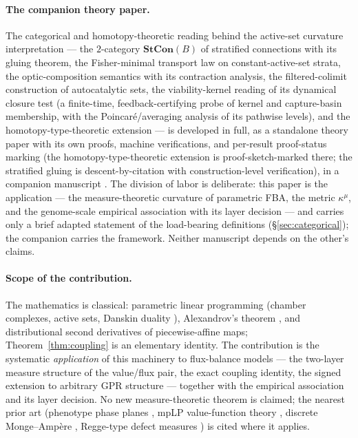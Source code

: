 \documentclass[11pt,a4paper]{article}
\theoremstyle{plain}
\theoremstyle{definition}
\theoremstyle{remark}
\newcommand{\kmu}{\kappa^{\mu}}
\begin{document}
\paragraph{The companion theory paper.}
The categorical and homotopy-theoretic reading behind the
active-set curvature interpretation --- the $2$-category
$\mathbf{StCon}(B)$ of stratified connections with its gluing
theorem, the Fisher-minimal transport law on constant-active-set
strata, the optic-composition semantics with its contraction
analysis, the filtered-colimit construction of autocatalytic sets,
the viability-kernel reading of its dynamical closure test (a
finite-time, feedback-certifying probe of kernel and capture-basin
membership, with the Poincar\'e/averaging analysis of its pathwise
levels), and the homotopy-type-theoretic extension --- is developed
in full,
as a standalone theory paper with its own proofs, machine
verifications, and per-result proof-status marking (the
homotopy-type-theoretic extension is proof-sketch-marked there; the
stratified gluing is descent-by-citation with construction-level
verification), in a companion manuscript \citep{zai2026categorical}.
The division of labor is deliberate: this paper is the application --- the
measure-theoretic curvature of parametric FBA, the metric $\kmu$,
and the genome-scale empirical association with its layer decision
--- and carries only a brief adapted statement of the load-bearing
definitions (\S\ref{sec:categorical}); the companion carries the
framework. Neither manuscript depends on the other's claims.

\paragraph{Scope of the contribution.}
The mathematics is classical: parametric linear programming (chamber
complexes, active sets, Danskin duality \citep{danskin1967}), Alexandrov's theorem \citep{alexandrov1939}, and
distributional second derivatives of piecewise-affine maps;
Theorem~\ref{thm:coupling} is an elementary identity. The contribution
is the systematic \emph{application} of this machinery to flux-balance
models \citep{varma1994, orth2010, lewis2010} --- the two-layer measure structure of the value/flux pair,
the exact coupling identity, the signed extension to arbitrary GPR
structure --- together with the empirical association and its layer
decision. No new measure-theoretic theorem is claimed; the nearest
prior art (phenotype phase planes \citep{edwards2001, ibarra2002}, mpLP
value-function theory \citep{borrelli2003},
discrete Monge--Amp\`ere \citep{gutierrez2001}, Regge-type defect measures \citep{regge1961, cheeger1984}) is cited where
it applies.
\end{document}
